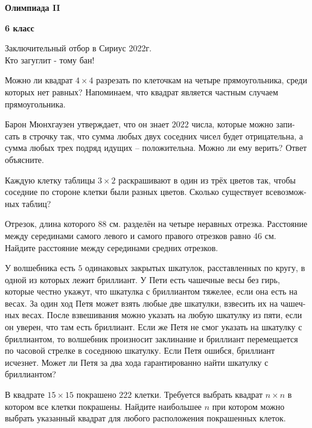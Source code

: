 \centerline{\Huge \bf  Олимпиада II}
\centerline{\Huge \bf 6 класс}

\begin{flushright}
    \scriptsize{Заключительный отбор в Сириус 2022г.\\ Кто загуглит - тому бан!}
\end{flushright}

Можно ли квадрат $4 \times 4$ разрезать по клеточкам на четыре прямоугольника, среди которых нет равных? Напоминаем, что квадрат является частным случаем прямоугольника.


Барон Мюнхгаузен утверждает, что он знает $2022$ числа, которые можно запи- сать в строчку так, что сумма любых двух соседних чисел будет отрицательна, а сумма любых трех подряд идущих – положительна. Можно ли ему верить? Ответ объясните.

Каждую клетку таблицы $3 \times 2$ раскрашивают в один из трёх цветов так, чтобы соседние по стороне клетки были разных цветов. Сколько существует всевозмож- ных таблиц?

Отрезок, длина которого $88$ см. разделён на четыре неравных отрезка. Расстояние между серединами самого левого и самого правого отрезков равно $46$ см. Найдите расстояние между серединами средних отрезков.

У волшебника есть $5$ одинаковых закрытых шкатулок, расставленных по кругу, в одной из которых лежит бриллиант. У Пети есть чашечные весы без гирь, которые честно укажут, что шкатулка с бриллиантом тяжелее, если она есть на весах. За один ход Петя может взять любые две шкатулки, взвесить их на чашеч- ных весах. После взвешивания можно указать на любую шкатулку из пяти, если он уверен, что там есть бриллиант. Если же Петя не смог указать на шкатулку с бриллиантом, то волшебник произносит заклинание и бриллиант перемещается по часовой стрелке в соседнюю шкатулку. Если Петя ошибся, бриллиант исчезнет. Может ли Петя за два хода гарантированно найти шкатулку с бриллиантом?

В квадрате $15 \times 15$ покрашено $222$ клетки. Требуется выбрать квадрат $n \times n$ в котором все клетки покрашены. Найдите наибольшее $n$ при котором можно выбрать указанный квадрат для любого расположения покрашенных клеток.
